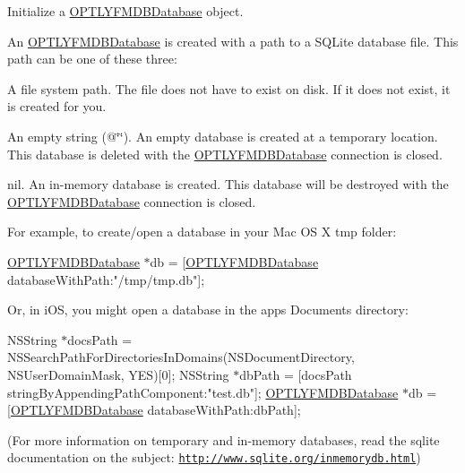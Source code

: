 Initialize a {\ttfamily \mbox{\hyperlink{interface_o_p_t_l_y_f_m_d_b_database}{O\+P\+T\+L\+Y\+F\+M\+D\+B\+Database}}} object.

An {\ttfamily \mbox{\hyperlink{interface_o_p_t_l_y_f_m_d_b_database}{O\+P\+T\+L\+Y\+F\+M\+D\+B\+Database}}} is created with a path to a S\+Q\+Lite database file. This path can be one of these three\+:


\begin{DoxyEnumerate}
\item A file system path. The file does not have to exist on disk. If it does not exist, it is created for you.
\item An empty string ({\ttfamily @\char`\"{}\char`\"{}}). An empty database is created at a temporary location. This database is deleted with the {\ttfamily \mbox{\hyperlink{interface_o_p_t_l_y_f_m_d_b_database}{O\+P\+T\+L\+Y\+F\+M\+D\+B\+Database}}} connection is closed.
\item {\ttfamily nil}. An in-\/memory database is created. This database will be destroyed with the {\ttfamily \mbox{\hyperlink{interface_o_p_t_l_y_f_m_d_b_database}{O\+P\+T\+L\+Y\+F\+M\+D\+B\+Database}}} connection is closed.
\end{DoxyEnumerate}

For example, to create/open a database in your Mac OS X {\ttfamily tmp} folder\+:

\mbox{\hyperlink{interface_o_p_t_l_y_f_m_d_b_database}{O\+P\+T\+L\+Y\+F\+M\+D\+B\+Database}} $\ast$db = \mbox{[}\mbox{\hyperlink{interface_o_p_t_l_y_f_m_d_b_database}{O\+P\+T\+L\+Y\+F\+M\+D\+B\+Database}} database\+With\+Path\+:"/tmp/tmp.db"\mbox{]};

Or, in i\+OS, you might open a database in the app\textquotesingle{}s {\ttfamily Documents} directory\+:

N\+S\+String $\ast$docs\+Path = N\+S\+Search\+Path\+For\+Directories\+In\+Domains(\+N\+S\+Document\+Directory, N\+S\+User\+Domain\+Mask, Y\+E\+S)\mbox{[}0\mbox{]}; N\+S\+String $\ast$db\+Path = \mbox{[}docs\+Path string\+By\+Appending\+Path\+Component\+:"test.\+db"\mbox{]}; \mbox{\hyperlink{interface_o_p_t_l_y_f_m_d_b_database}{O\+P\+T\+L\+Y\+F\+M\+D\+B\+Database}} $\ast$db = \mbox{[}\mbox{\hyperlink{interface_o_p_t_l_y_f_m_d_b_database}{O\+P\+T\+L\+Y\+F\+M\+D\+B\+Database}} database\+With\+Path\+:db\+Path\mbox{]};

(For more information on temporary and in-\/memory databases, read the sqlite documentation on the subject\+: \href{http://www.sqlite.org/inmemorydb.html}{\tt http\+://www.\+sqlite.\+org/inmemorydb.\+html})


